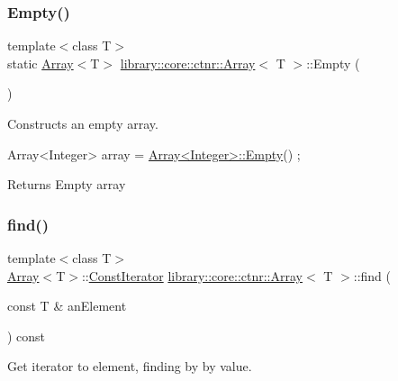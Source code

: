 \subsubsection{\texorpdfstring{Empty()}{Empty()}}
{\footnotesize\ttfamily template$<$class T$>$ \\
static \hyperlink{classlibrary_1_1core_1_1ctnr_1_1_array}{Array}$<$T$>$ \hyperlink{classlibrary_1_1core_1_1ctnr_1_1_array}{library\+::core\+::ctnr\+::\+Array}$<$ T $>$\+::Empty (\begin{DoxyParamCaption}{ }\end{DoxyParamCaption})\hspace{0.3cm}{\ttfamily [static]}}



Constructs an empty array. 


\begin{DoxyCode}
Array<Integer> array = \hyperlink{classlibrary_1_1core_1_1ctnr_1_1_array_a7795ee997ae6008cd0bc8db607315524}{Array<Integer>::Empty}() ;
\end{DoxyCode}


\begin{DoxyReturn}{Returns}
Empty array 
\end{DoxyReturn}
\mbox{\label{classlibrary_1_1core_1_1ctnr_1_1_array_aeb8ed38b67b6031e27c188d89bd5cbbf}} 
\subsubsection{\texorpdfstring{find()}{find()}\hspace{0.1cm}{\footnotesize\ttfamily [1/2]}}
{\footnotesize\ttfamily template$<$class T$>$ \\
\hyperlink{classlibrary_1_1core_1_1ctnr_1_1_array}{Array}$<$T$>$\+::\hyperlink{classlibrary_1_1core_1_1ctnr_1_1_array_ac26454f2a2ad4013873386a70aa25fc4}{Const\+Iterator} \hyperlink{classlibrary_1_1core_1_1ctnr_1_1_array}{library\+::core\+::ctnr\+::\+Array}$<$ T $>$\+::find (\begin{DoxyParamCaption}\item[{const T \&}]{an\+Element }\end{DoxyParamCaption}) const}



Get iterator to element, finding by by value. 


